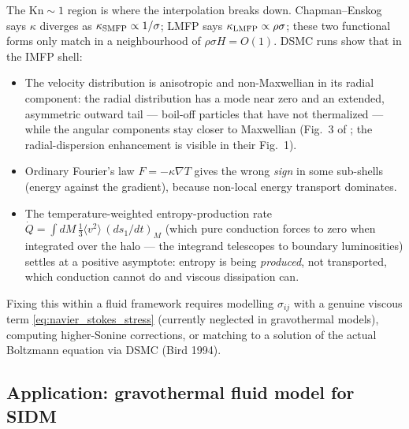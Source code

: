 \documentclass[12pt]{article}
\begin{document}
The $\mathrm{Kn}\sim 1$ region is where the interpolation breaks
down.  Chapman--Enskog says $\kappa$ diverges as
$\kappa_{\rm SMFP}\propto 1/\sigma$; LMFP says $\kappa_{\rm LMFP}
\propto\rho\sigma$; these two functional forms only match in a
neighbourhood of $\rho\sigma H = O(1)$.  \citet{Gurian2025Core} DSMC
runs show that in the IMFP shell:
%
\begin{itemize}
  \item The velocity distribution is anisotropic and
        non-Maxwellian in its radial component: the radial
        distribution has a mode near zero and an extended,
        asymmetric outward tail --- boil-off particles that have not
        thermalized --- while the angular components stay closer to
        Maxwellian (Fig.~3 of \citealt{Gurian2025Core}; the
        radial-dispersion enhancement is visible in their Fig.~1).
  \item Ordinary Fourier's law $F = -\kappa\nabla T$ gives the wrong
        \emph{sign} in some sub-shells (energy against the gradient),
        because non-local energy transport dominates.
  \item The temperature-weighted entropy-production rate
        $\dot Q = \int dM\,\tfrac13\langle v^2\rangle\,(ds_1/dt)_M$
        (which pure conduction forces to zero when integrated over
        the halo --- the integrand telescopes to boundary
        luminosities) settles at a positive asymptote: entropy is
        being \emph{produced}, not transported, which conduction
        cannot do and viscous dissipation can.
\end{itemize}
%
Fixing this within a fluid framework requires modelling $\sigma_{ij}$
with a genuine viscous term \eqref{eq:navier_stokes_stress} (currently
neglected in gravothermal models), computing higher-Sonine
corrections, or matching to a solution of the actual Boltzmann
equation via DSMC (Bird 1994).

\subsection{Application: gravothermal fluid model for SIDM}
\label{app:sidm_fluid}
\end{document}
